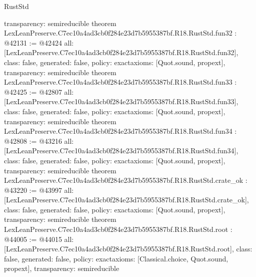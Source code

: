 \begin{lexlean}{RustStd}
\begin{coremodule}
{  transparency: semireducible
}
theorem LexLeanPreserve.C7ec10a4ad3cb0f284e23d7b5955387bf.R18.RustStd.fun32 : @42131 := @42424 {
  all: [LexLeanPreserve.C7ec10a4ad3cb0f284e23d7b5955387bf.R18.RustStd.fun32],
  class: false,
  generated: false,
  policy: exact{axioms: [Quot.sound, propext]},
  transparency: semireducible
}
theorem LexLeanPreserve.C7ec10a4ad3cb0f284e23d7b5955387bf.R18.RustStd.fun33 : @42425 := @42807 {
  all: [LexLeanPreserve.C7ec10a4ad3cb0f284e23d7b5955387bf.R18.RustStd.fun33],
  class: false,
  generated: false,
  policy: exact{axioms: [Quot.sound, propext]},
  transparency: semireducible
}
theorem LexLeanPreserve.C7ec10a4ad3cb0f284e23d7b5955387bf.R18.RustStd.fun34 : @42808 := @43216 {
  all: [LexLeanPreserve.C7ec10a4ad3cb0f284e23d7b5955387bf.R18.RustStd.fun34],
  class: false,
  generated: false,
  policy: exact{axioms: [Quot.sound, propext]},
  transparency: semireducible
}
theorem LexLeanPreserve.C7ec10a4ad3cb0f284e23d7b5955387bf.R18.RustStd.crate_ok : @43220 := @43997 {
  all: [LexLeanPreserve.C7ec10a4ad3cb0f284e23d7b5955387bf.R18.RustStd.crate_ok],
  class: false,
  generated: false,
  policy: exact{axioms: [Quot.sound, propext]},
  transparency: semireducible
}
theorem LexLeanPreserve.C7ec10a4ad3cb0f284e23d7b5955387bf.R18.RustStd.root : @44005 := @44015 {
  all: [LexLeanPreserve.C7ec10a4ad3cb0f284e23d7b5955387bf.R18.RustStd.root],
  class: false,
  generated: false,
  policy: exact{axioms: [Classical.choice, Quot.sound, propext]},
  transparency: semireducible
}


\end{coremodule}
\end{lexlean}
